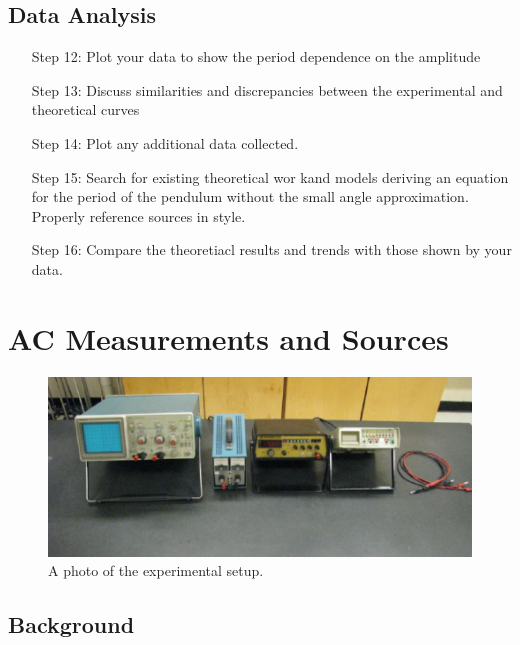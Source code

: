 \documentclass[12pt, a4paper, oneside, openright, titlepage]{book}
\begin{document}
\section{Data Analysis}


\begin{itemize}[leftmargin = 50pt]
    \item[Step 12:] Plot your data to show the period dependence on the amplitude
    \item[Step 13:] Discuss similarities and discrepancies between the experimental and theoretical curves
    \item[Step 14:] Plot any additional data collected.
    \item[Step 15:] Search for existing theoretical wor kand models deriving an equation for the period of the pendulum without the small angle approximation. Properly reference sources in  style.
    \item[Step 16:] Compare the theoretiacl results and trends with those shown by your data.
\end{itemize}






\chapter{AC Measurements and Sources}

\begin{figure}[H]
    \centering
    \includegraphics[scale = 0.8]{Images/ACDCSetup.PNG}
    \caption{A photo of the experimental setup.}
    \label{fig:ACDCSetup}
\end{figure}


\section{Background}
\end{document}
